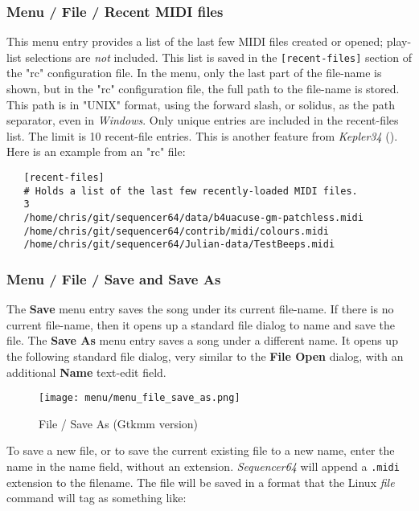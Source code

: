 \subsubsection{Menu / File / Recent MIDI files}
\label{subsubsec:seq64_menu_file_recent}

   This menu entry
   provides a list of the last few MIDI files created or opened;
   play-list selections are \textsl{not} included.
   This list is saved in the \texttt{[recent-files]} section of the
   "rc" configuration file.  In the menu, only the last part of the file-name is
   shown, but in the "rc" configuration file, the full path to the file-name is
   stored.  This path is in "UNIX" format, using the forward slash, or solidus,
   as the path separator, even in \textsl{Windows}.
   Only unique entries are included in the recent-files list.
   The limit is 10 recent-file entries.
   This is another feature from \textsl{Kepler34} (\cite{kepler34}).
   Here is an example from an "rc" file:

\begin{verbatim}
   [recent-files]
   # Holds a list of the last few recently-loaded MIDI files.
   3
   /home/chris/git/sequencer64/data/b4uacuse-gm-patchless.midi
   /home/chris/git/sequencer64/contrib/midi/colours.midi
   /home/chris/git/sequencer64/Julian-data/TestBeeps.midi
\end{verbatim}

\subsubsection{Menu / File / Save and Save As}
\label{subsubsec:menu_file_open_save_as}

   The \textbf{Save} menu entry saves the song under its current file-name.
   If there is no current file-name, then it opens up a standard file
   dialog to name and save the file.
   The \textbf{Save As} menu entry saves a song under a different name.
   It opens up the following standard file dialog, very similar to the 
   \textbf{File Open} dialog, with an additional \textbf{Name} text-edit field.

\begin{figure}[H]
   \centering 
   \texttt{[image: menu/menu\_file\_save\_as.png]}
   \caption{File / Save As (Gtkmm version)}
   \label{fig:seq64_menu_file_save_as}
\end{figure}

   To save a new file, or to save the current existing file to a new name,
   enter the name in the name field, without an extension.
   \textsl{Sequencer64} will append a \texttt{.midi} extension to the filename.
   The file will be saved in a format that the Linux \textsl{file} command
   will tag as something like:

